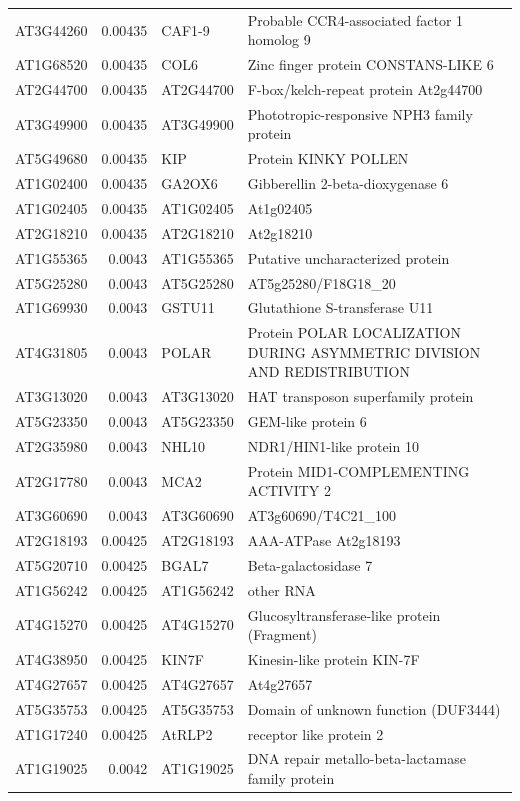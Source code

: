 \documentclass[11pt]{article}
\begin{document}
\begin{center}
\begin{tabular}{lrll}
AT3G44260 & 0.00435 & CAF1-9 & Probable CCR4-associated factor 1 homolog 9\\
AT1G68520 & 0.00435 & COL6 & Zinc finger protein CONSTANS-LIKE 6\\
AT2G44700 & 0.00435 & AT2G44700 & F-box/kelch-repeat protein At2g44700\\
AT3G49900 & 0.00435 & AT3G49900 & Phototropic-responsive NPH3 family protein\\
AT5G49680 & 0.00435 & KIP & Protein KINKY POLLEN\\
AT1G02400 & 0.00435 & GA2OX6 & Gibberellin 2-beta-dioxygenase 6\\
AT1G02405 & 0.00435 & AT1G02405 & At1g02405\\
AT2G18210 & 0.00435 & AT2G18210 & At2g18210\\
AT1G55365 & 0.0043 & AT1G55365 & Putative uncharacterized protein\\
AT5G25280 & 0.0043 & AT5G25280 & AT5g25280/F18G18\_20\\
AT1G69930 & 0.0043 & GSTU11 & Glutathione S-transferase U11\\
AT4G31805 & 0.0043 & POLAR & Protein POLAR LOCALIZATION DURING ASYMMETRIC DIVISION AND REDISTRIBUTION\\
AT3G13020 & 0.0043 & AT3G13020 & HAT transposon superfamily protein\\
AT5G23350 & 0.0043 & AT5G23350 & GEM-like protein 6\\
AT2G35980 & 0.0043 & NHL10 & NDR1/HIN1-like protein 10\\
AT2G17780 & 0.0043 & MCA2 & Protein MID1-COMPLEMENTING ACTIVITY 2\\
AT3G60690 & 0.0043 & AT3G60690 & AT3g60690/T4C21\_100\\
AT2G18193 & 0.00425 & AT2G18193 & AAA-ATPase At2g18193\\
AT5G20710 & 0.00425 & BGAL7 & Beta-galactosidase 7\\
AT1G56242 & 0.00425 & AT1G56242 & other RNA\\
AT4G15270 & 0.00425 & AT4G15270 & Glucosyltransferase-like protein (Fragment)\\
AT4G38950 & 0.00425 & KIN7F & Kinesin-like protein KIN-7F\\
AT4G27657 & 0.00425 & AT4G27657 & At4g27657\\
AT5G35753 & 0.00425 & AT5G35753 & Domain of unknown function (DUF3444)\\
AT1G17240 & 0.00425 & AtRLP2 & receptor like protein 2\\
AT1G19025 & 0.0042 & AT1G19025 & DNA repair metallo-beta-lactamase family protein\\

\end{tabular}
\end{center}
\end{document}
